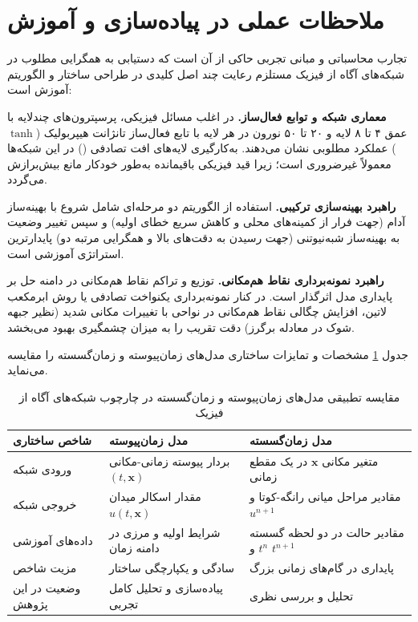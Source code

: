 \section{ملاحظات عملی در پیاده‌سازی و آموزش}
\label{sec:practical}

تجارب محاسباتی و مبانی تجربی حاکی از آن است که دستیابی به همگرایی مطلوب در شبکه‌های آگاه از فیزیک مستلزم رعایت چند اصل کلیدی در طراحی ساختار و الگوریتم آموزش است:

\textbf{معماری شبکه و توابع فعال‌ساز.} در اغلب مسائل فیزیکی، پرسپترون‌های چندلایه با عمق ۴ تا ۸ لایه و ۲۰ تا ۵۰ نورون در هر لایه با تابع فعال‌ساز تانژانت هیپربولیک ($\tanh$) عملکرد مطلوبی نشان می‌دهند. به‌کارگیری لایه‌های افت تصادفی () در این شبکه‌ها معمولاً غیرضروری است؛ زیرا قید فیزیکی باقیمانده به‌طور خودکار مانع بیش‌برازش می‌گردد.

\textbf{راهبرد بهینه‌سازی ترکیبی.} استفاده از الگوریتم دو مرحله‌ای شامل شروع با بهینه‌ساز آدام (جهت فرار از کمینه‌های محلی و کاهش سریع خطای اولیه) و سپس تغییر وضعیت به بهینه‌ساز شبه‌نیوتنی  (جهت رسیدن به دقت‌های بالا و همگرایی مرتبه دو) پایدارترین استراتژی آموزشی است.

\textbf{راهبرد نمونه‌برداری نقاط هم‌مکانی.} توزیع و تراکم نقاط هم‌مکانی در دامنه حل بر پایداری مدل اثرگذار است. در کنار نمونه‌برداری یکنواخت تصادفی یا روش ابرمکعب لاتین، افزایش چگالی نقاط هم‌مکانی در نواحی با تغییرات مکانی شدید (نظیر جبهه شوک در معادله برگرز) دقت تقریب را به میزان چشمگیری بهبود می‌بخشد.

جدول \ref{tab:models} مشخصات و تمایزات ساختاری مدل‌های زمان‌پیوسته و زمان‌گسسته را مقایسه می‌نماید.

\begin{table}[t]
\caption{مقایسه تطبیقی مدل‌های زمان‌پیوسته و زمان‌گسسته در چارچوب شبکه‌های آگاه از فیزیک}
\label{tab:models}
\centering
\singlespacing
\begin{tabular}{|p{3.2cm}|p{5.0cm}|p{5.4cm}|}
\hline
\textbf{شاخص ساختاری} & \textbf{مدل زمان‌پیوسته} & \textbf{مدل زمان‌گسسته} \\
\hline
ورودی شبکه & بردار پیوسته زمانی-مکانی $(t, \mathbf{x})$ & متغیر مکانی $\mathbf{x}$ در یک مقطع زمانی \\
\hline
خروجی شبکه & مقدار اسکالر میدان $u(t,\mathbf{x})$ & مقادیر مراحل میانی رانگه-کوتا و $u^{n+1}$ \\
\hline
داده‌های آموزشی & شرایط اولیه و مرزی در دامنه زمان & مقادیر حالت در دو لحظه گسسته $t^n$ و $t^{n+1}$ \\
\hline
مزیت شاخص & سادگی و یکپارچگی ساختار & پایداری در گام‌های زمانی بزرگ \\
\hline
وضعیت در این پژوهش & پیاده‌سازی و تحلیل کامل تجربی & تحلیل و بررسی نظری \\
\hline
\end{tabular}
\end{table}

